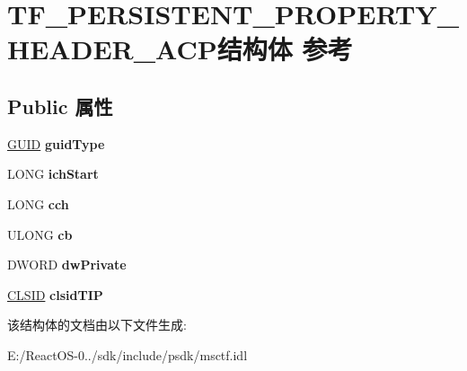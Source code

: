 \hypertarget{struct_t_f___p_e_r_s_i_s_t_e_n_t___p_r_o_p_e_r_t_y___h_e_a_d_e_r___a_c_p}{}\section{T\+F\+\_\+\+P\+E\+R\+S\+I\+S\+T\+E\+N\+T\+\_\+\+P\+R\+O\+P\+E\+R\+T\+Y\+\_\+\+H\+E\+A\+D\+E\+R\+\_\+\+A\+C\+P结构体 参考}
\label{struct_t_f___p_e_r_s_i_s_t_e_n_t___p_r_o_p_e_r_t_y___h_e_a_d_e_r___a_c_p}
\subsection*{Public 属性}
\begin{DoxyCompactItemize}
\item 
\mbox{\label{struct_t_f___p_e_r_s_i_s_t_e_n_t___p_r_o_p_e_r_t_y___h_e_a_d_e_r___a_c_p_af7f3418ef36b5f4b9d12e5b20245cd6d}} 
\hyperlink{interface_g_u_i_d}{G\+U\+ID} {\bfseries guid\+Type}
\item 
\mbox{\label{struct_t_f___p_e_r_s_i_s_t_e_n_t___p_r_o_p_e_r_t_y___h_e_a_d_e_r___a_c_p_a50f2240317d0d29937b997d853d05d7f}} 
L\+O\+NG {\bfseries ich\+Start}
\item 
\mbox{\label{struct_t_f___p_e_r_s_i_s_t_e_n_t___p_r_o_p_e_r_t_y___h_e_a_d_e_r___a_c_p_a1dadbfc7d584c03b1fc293c54953a8ab}} 
L\+O\+NG {\bfseries cch}
\item 
\mbox{\label{struct_t_f___p_e_r_s_i_s_t_e_n_t___p_r_o_p_e_r_t_y___h_e_a_d_e_r___a_c_p_a76ca6202b27ac307fa1644db64ca8a0b}} 
U\+L\+O\+NG {\bfseries cb}
\item 
\mbox{\label{struct_t_f___p_e_r_s_i_s_t_e_n_t___p_r_o_p_e_r_t_y___h_e_a_d_e_r___a_c_p_a529b8ad9a24d09ee998b4ddc684d4e81}} 
D\+W\+O\+RD {\bfseries dw\+Private}
\item 
\mbox{\label{struct_t_f___p_e_r_s_i_s_t_e_n_t___p_r_o_p_e_r_t_y___h_e_a_d_e_r___a_c_p_aee469eefa6bd05a3863e40a7ea286764}} 
\hyperlink{struct___i_i_d}{C\+L\+S\+ID} {\bfseries clsid\+T\+IP}
\end{DoxyCompactItemize}


该结构体的文档由以下文件生成\+:\begin{DoxyCompactItemize}
\item 
E\+:/\+React\+O\+S-\/0../sdk/include/psdk/msctf.\+idl\end{DoxyCompactItemize}
